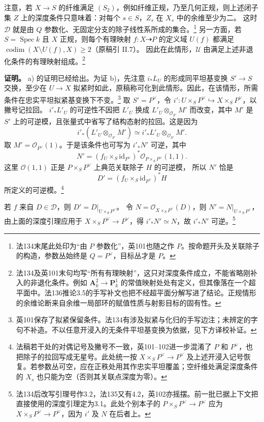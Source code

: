 \documentclass[openany,fontset=fandol]{ctexbook}
\DeclareMathOperator{\Spec}{Spec}
\newcommand{\OO}{\mathcal O}
\begin{document}
注意，若 \(X\to S\) 的纤维满足 \((S_2)\)，例如纤维正规，乃至几何正规，则上述闭子集 \(Z\) 上的深度条件只意味着：对每个 \(s\in S\)，\(Z_s\) 在 \(X_s\) 中的余维至少为二。
这时 \(\mathcal D\) 就是由 \(Q\) 参数化、无固定分支的除子线性系所成的集合。\footnote{法134末尾此处印为“由 \(P\) 参数化”，英101也随之作 \(P\)。按命题开头及关联除子的构造，参数丛始终是 \(Q=P^\vee\)，目标丛才是 \(P\)。}
另一方面，若 \(S=\Spec k\) 且 \(X\) 正规，则每个有理映射 \(f:X\dashrightarrow P\) 的定义域 \(U(f)\) 都满足
\(\operatorname{codim}(X\setminus U(f),X)\ge2\)（原稿引 II.7）。
因此在此情形，\(\mathcal U\) 由满足上述非退化条件的有理映射组成。\footnote{法134及英101末句均写“所有有理映射”，这只对深度条件成立，不能省略刚补入的非退化条件。例如 \(\mathbf A^2_k\to\mathbf P^1_k\) 的常值映射处处有定义，但其像落在一个超平面中。法136推论3.5的手写补文也把不经超平面分解写进了结论。正规情形的余维论断来自余维一局部环的赋值性质与射影目标的固有性。}

\medskip\noindent\textbf{证明。}
a) 的证明已经给出。为证 b)，先注意 \(i_*L_U\) 的形成同平坦基变换 \(S'\to S\) 交换，至少在 \(U\to X\) 拟紧时如此，原稿称可化到此情形。因此，在该情形，所需条件在忠实平坦拟紧基变换下不变。\footnote{英101保存了拟紧保留条件。法134有涉及拟紧与化归的手写边注；未辨定的字句不补造。不以任意开浸入的无条件平坦基变换为依据，见下方译校补证。}
取 \(S'=P^\vee\)，令 \(i':U\times_S P^\vee\hookrightarrow X\times_S P^\vee\)，以撇号记拉回。
\(i'_*L'_U\) 的可逆性不因把 \(L'_U\) 换成 \(L'_U\otimes_{\OO_{S'}}M'\) 而改变，其中 \(M'\) 是 \(S'\) 上的可逆模，且张量式中省写了结构态射的拉回。这是因为
\[
 i'_*(L'_U\otimes_{\OO_{S'}} M')
 \simeq i'_*L'_U\otimes_{\OO_{S'}} M' .
\]
取 \(M'=\OO_{P^\vee}(1)\)。于是该条件也可写为 \(i'_*N'\) 可逆，其中
\[
 N'=(f_U\times_S\mathrm{id}_{P^\vee})^*
       \OO_{P\times_S P^\vee}(1,1).
\]
这里 \(\OO(1,1)\) 正是 \(P\times_S P^\vee\) 上典范关联除子 \(H\) 的可逆模，
所以 \(N'\) 恰是
\[
 D'=(f_U\times_S\mathrm{id}_{P^\vee})^*H
\]
所定义的可逆模。\footnote{法稿若干处的对偶记号及撇号不一致，英101--102进一步混淆了 \(P\) 和 \(P^\vee\)，也把除子的拉回写成无星号。此处统一按 \(X\times_S P^\vee\to P^\vee\) 及上述开浸入记号恢复。若参数丛可空，应在正秩处用其作忠实平坦覆盖；空纤维处满足深度条件的 \(X_s\) 也只能为空（否则其关联点深度为零）。}

若 \(f\) 来自 \(D\in\mathcal D\)，则 \(D'=D|_{U\times_S P^\vee}\)。
令 \(N=\OO_{X\times_S P^\vee}(D)\)，则 \(N'=N|_{U\times_S P^\vee}\)，
由上面的深度引理应用于 \(X\times_S P^\vee\to P^\vee\)，得
\(i'_*N'\simeq N\)，故 \(i'_*N'\) 可逆。\footnote{法134后改写引理号作3.2，法135又有4.2，英102亦摇摆。前一批已据上下文把直接使用的深度引理定为3.1。此处个别本子的 \(P\times_S P^\vee\to P^\vee\) 应为 \(X\times_S P^\vee\to P^\vee\)，因为 \(i'\) 及 \(N\) 在后者上。}
\end{document}
